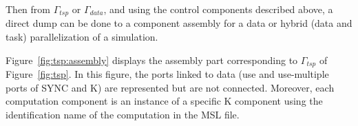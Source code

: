 Then from $\Gamma_{tsp}$ or $\Gamma_{data}$, and using the control components described above,
a direct dump can be done to a component assembly for a data or hybrid (data
and task) parallelization of a simulation.

Figure~\ref{fig:tsp:assembly} displays the assembly part corresponding to
$\Gamma_{tsp}$ of Figure~\ref{fig:tsp}. In this figure, the ports
linked to data (use and use-multiple ports of SYNC and K) are
represented but are not connected. Moreover, each computation
component is an instance of a specific K component using
the identification name of the computation in the MSL file.


